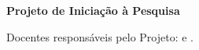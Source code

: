 \documentclass[12pt,a4paper,header]{abnt}
\begin{document}
\begin{titlepage}

\thispagestyle{logouff}

\vspace{2cm}

\hspace{.2\textwidth} %
\begin{minipage}{.7\textwidth}

\begin{flushright}

{\large \bf \ABNTautordata} \\[3cm]

{\Large \bf \ABNTtitulodata}\\[3cm]

{\bf Projeto de Iniciação à Pesquisa}\\[1cm]

\end{flushright}

\begin{espacosimples}

\ABNTcomentariodata

\end{espacosimples}

\vspace{1cm}

\hfill Docentes responsáveis pelo Projeto: \ABNTorientadordata \; e \; \ABNTcoorientadordata \;.


\end{minipage}

\vspace{7cm}

\begin{center}

\ABNTlocaldata

\ABNTdatadata

\end{center}

\end{titlepage}



\end{document}
